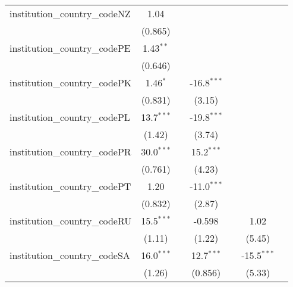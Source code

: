 \begin{tabular}{lcccccc}
   institution\_country\_codeNZ          & 1.04          &              &               &               &               &   \\   
                                         & (0.865)       &              &               &               &               &   \\   
   institution\_country\_codePE          & 1.43$^{**}$   &              &               &               &               &   \\   
                                         & (0.646)       &              &               &               &               &   \\   
   institution\_country\_codePK          & 1.46$^{*}$    &              & -16.8$^{***}$ &               &               &   \\   
                                         & (0.831)       &              & (3.15)        &               &               &   \\   
   institution\_country\_codePL          & 13.7$^{***}$  &              & -19.8$^{***}$ &               &               &   \\   
                                         & (1.42)        &              & (3.74)        &               &               &   \\   
   institution\_country\_codePR          & 30.0$^{***}$  &              & 15.2$^{***}$  &               &               &   \\   
                                         & (0.761)       &              & (4.23)        &               &               &   \\   
   institution\_country\_codePT          & 1.20          &              & -11.0$^{***}$ &               &               &   \\   
                                         & (0.832)       &              & (2.87)        &               &               &   \\   
   institution\_country\_codeRU          & 15.5$^{***}$  &              & -0.598        &               & 1.02          &   \\   
                                         & (1.11)        &              & (1.22)        &               & (5.45)        &   \\   
   institution\_country\_codeSA          & 16.0$^{***}$  &              & 12.7$^{***}$  &               & -15.5$^{***}$ &   \\   
                                         & (1.26)        &              & (0.856)       &               & (5.33)        &   \\   

\end{tabular}
